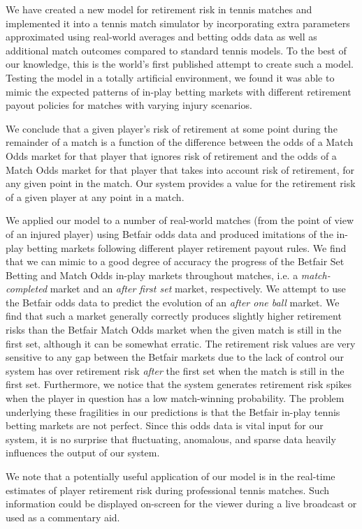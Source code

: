 \documentclass[letterpaper,12pt]{article}
\begin{document}
We have created a new model for retirement risk in tennis matches and implemented it into a tennis match simulator by incorporating extra parameters approximated using real-world averages and betting odds data as well as additional match outcomes compared to standard tennis models.  To the best of our knowledge, this is the world's first published attempt to create such a model.  Testing the model in a totally artificial environment, we found it was able to mimic the expected patterns of in-play betting markets with different retirement payout policies for matches with varying injury scenarios.

We conclude that a given player's risk of retirement at some point during the remainder of a match is a function of the difference between the odds of a Match Odds market for that player that ignores risk of retirement and the odds of a Match Odds market for that player that takes into account risk of retirement, for any given point in the match.  Our system provides a value for the retirement risk of a given player at any point in a match.

We applied our model to a number of real-world matches (from the point of view of an injured player) using Betfair odds data and produced imitations of the in-play betting markets following different player retirement payout rules.  We find that we can mimic to a good degree of accuracy the progress of the Betfair Set Betting and Match Odds in-play markets throughout matches, i.e. a \textit{match-completed} market and an \textit{after first set} market, respectively.  We attempt to use the Betfair odds data to predict the evolution of an \textit{after one ball} market.  We find that such a market generally correctly produces slightly higher retirement risks than the Betfair Match Odds market when the given match is still in the first set, although it can be somewhat erratic.  The retirement risk values are very sensitive to any gap between the Betfair markets due to the lack of control our system has over retirement risk \textit{after} the first set when the match is still in the first set.  Furthermore, we notice that the system generates retirement risk spikes when the player in question has a low match-winning probability.  The problem underlying these fragilities in our predictions is that the Betfair in-play tennis betting markets are not perfect.  Since this odds data is vital input for our system, it is no surprise that fluctuating, anomalous, and sparse data heavily influences the output of our system.

We note that a potentially useful application of our model is in the real-time estimates of player retirement risk during professional tennis matches.  Such information could be displayed on-screen for the viewer during a live broadcast or used as a commentary aid.



\end{document}
